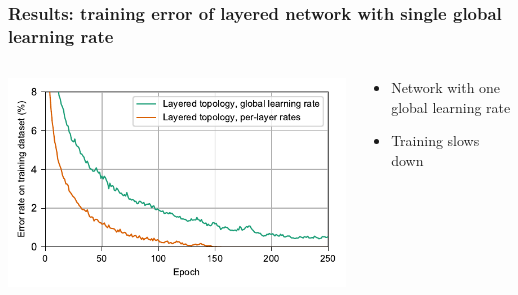 \documentclass[pdf]{beamer}
\begin{document}
\begin{frame}
	\frametitle{Results: training error of layered network with single global learning rate}
	\begin{columns}
	\begin{column}{.6\textwidth}
		\includegraphics[width=\textwidth]{figures/performance_original+global.pdf}
	\end{column}
	\begin{column}{.4\textwidth}
	\begin{itemize}
		\item Network with one global learning rate
		\item Training slows down
	\end{itemize}
	\end{column}
	\end{columns}
\end{frame}
\end{document}
